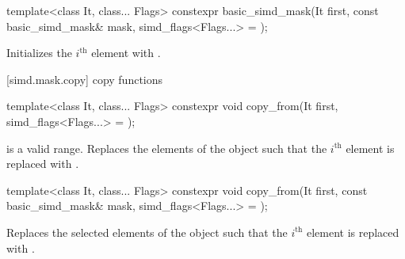 \begin{itemdecl}
template<class It, class... Flags>
  constexpr basic_simd_mask(It first, const basic_simd_mask& mask, simd_flags<Flags...> = {});
\end{itemdecl}

\begin{itemdescr}
  \MaskLoadDescr
    {\validMaskedRange}
    {Initializes the $i^\text{th}$ element with  \foralli.}
\end{itemdescr}

[simd.mask.copy]{ copy functions}

\begin{itemdecl}
template<class It, class... Flags>
  constexpr void copy_from(It first, simd_flags<Flags...> = {});
\end{itemdecl}

\begin{itemdescr}
  \MaskLoadDescr
  { is a valid range.}
  {Replaces the elements of the  object such that the $i^\text{th}$ element is replaced with  \foralli.}
\end{itemdescr}

\begin{itemdecl}
template<class It, class... Flags>
  constexpr void copy_from(It first, const basic_simd_mask& mask, simd_flags<Flags...> = {});
\end{itemdecl}

\begin{itemdescr}
  \MaskLoadDescr
    {\validMaskedRange}
    {Replaces the selected elements of the  object such that the $i^\text{th}$ element is replaced with  \forallmaskedi.}
\end{itemdescr}

\newcommand\MaskStoreDescr[2]{
  \pnum\constraints
  \begin{itemize}
    \item \tcode{iter_value_t<Out>} is of type \tcode{bool}, and
    \item \tcode{Out} models \tcode{contiguous_iterator}, and
    \item \tcode{Out} models \tcode{indirectly_writable<value_type>}.
  \end{itemize}

  \pnum\expects
  \begin{itemize}
    \item #1
    \flagsRequires{basic_simd_mask}{value_type}
  \end{itemize}

  \pnum\effects #2

  \pnum\throws Nothing.
}

